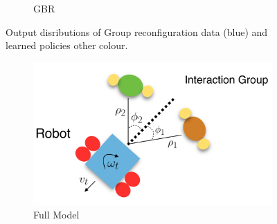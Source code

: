 \documentclass[letterpaper, 10 pt, conference]{ieeeconf}
\begin{document}
\begin{figure}[tbh]
\begin{subfigure}[b]{0.45\columnwidth}
    \caption{GBR}
       \label{fig:robot}
  \end{subfigure} 
  \caption{Output disributions of Group reconfiguration data (blue) and learned policies other colour.}

    \vspace{-2mm}
  \label{fig:data_robot}
  \end{figure}


  	\begin{figure}[tbh]
      \begin{subfigure}[b]{0.45\columnwidth}

    \includegraphics[scale = 0.22]{images/data.png}
    \caption{Full Model}
    \label{fig:data}
  \end{subfigure}
    	\hspace{4mm}
  \begin{subfigure}[b]{0.45\columnwidth}


\end{subfigure}
\end{figure}
\end{document}

